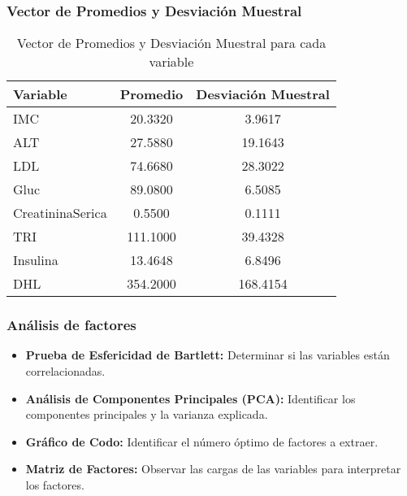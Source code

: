\documentclass[
	11pt, %
]{beamer}
\begin{document}


\begin{frame}
  \frametitle{Vector de Promedios y Desviación Muestral}

  \begin{table}[ht]
    \centering
    \begin{tabular}{|l|c|c|}
      \hline
      \textbf{Variable} & \textbf{Promedio} & \textbf{Desviación Muestral} \\
      \hline
      IMC & 20.3320 & 3.9617 \\
      ALT & 27.5880 & 19.1643 \\
      LDL & 74.6680 & 28.3022 \\
      Gluc & 89.0800 & 6.5085 \\
      CreatininaSerica & 0.5500 & 0.1111 \\
      TRI & 111.1000 & 39.4328 \\
      Insulina & 13.4648 & 6.8496 \\
      DHL & 354.2000 & 168.4154 \\
      \hline
    \end{tabular}
    \caption{Vector de Promedios y Desviación Muestral para cada variable}
  \end{table}

\end{frame}


\begin{frame}
  \frametitle{Análisis de factores}

    \begin{itemize}
    \item \textbf{Prueba de Esfericidad de Bartlett:} Determinar si las variables están correlacionadas.
    \item \textbf{Análisis de Componentes Principales (PCA):} Identificar los componentes principales y la varianza explicada.
    \item \textbf{Gráfico de Codo:} Identificar el número óptimo de factores a extraer.
    \item \textbf{Matriz de Factores:} Observar las cargas de las variables para interpretar los factores.
  \end{itemize}
 
\end{frame}
\end{document}
